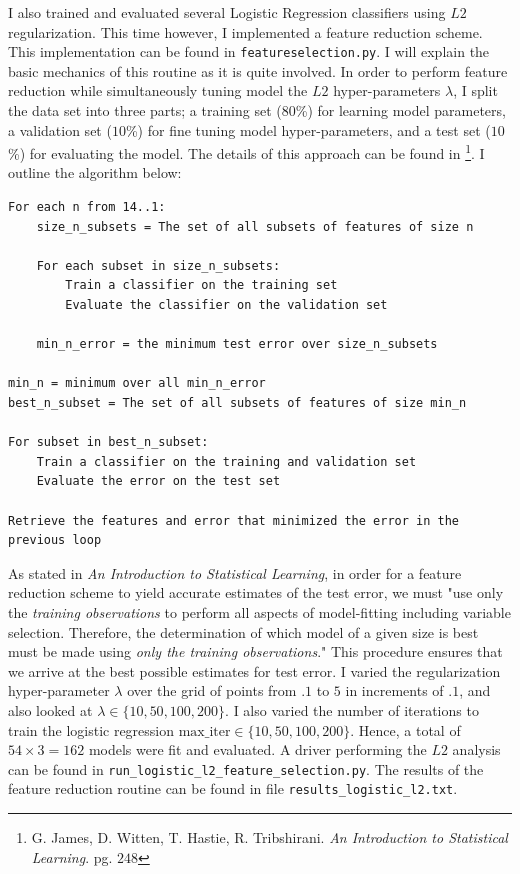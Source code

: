 \documentclass[11pt, oneside]{article}   	%
\begin{document}
I also trained and evaluated several Logistic Regression classifiers using $L2$ regularization. This time however, I implemented a feature reduction scheme. This implementation can be found in \texttt{featureselection.py}. I will explain the basic mechanics of this routine as it is quite involved. In order to perform feature reduction while simultaneously tuning model the $L2$ hyper-parameters $ \lambda $, I split the data set into three parts; a training set ($80$\%) for learning model parameters, a validation set ($10$\%) for fine tuning model hyper-parameters, and a test set ($10$\%) for evaluating the model. The details of this approach can be found in 
\footnote[3]{G. James, D. Witten, T. Hastie, R. Tribshirani. \textit{An Introduction to Statistical Learning}. pg. $248$}.
I outline the algorithm below:
\begin{verbatim}
For each n from 14..1:
    size_n_subsets = The set of all subsets of features of size n
  
    For each subset in size_n_subsets:
        Train a classifier on the training set
        Evaluate the classifier on the validation set
    
    min_n_error = the minimum test error over size_n_subsets
  
min_n = minimum over all min_n_error
best_n_subset = The set of all subsets of features of size min_n

For subset in best_n_subset:
    Train a classifier on the training and validation set
    Evaluate the error on the test set
    
Retrieve the features and error that minimized the error in the previous loop
\end{verbatim} 
As stated in \textit{An Introduction to Statistical Learning}, in order for a feature reduction scheme to yield accurate estimates of the test error, we must "use only the \textit{training observations} to perform all aspects of model-fitting including variable selection. Therefore, the determination of which model of a given size is best must be made using \textit{only the training observations}."  This procedure ensures that we arrive at the best possible estimates for test error. I varied the regularization hyper-parameter $ \lambda $ over the grid of points from $.1$ to $5$ in increments of $.1$, and also looked at $ \lambda \in \{ 10, 50, 100, 200 \} $. I also varied the number of iterations to train the logistic regression $ \text{max\_iter} \in \{ 10,50,100,200 \}$. Hence, a total of $54 \times 3 = 162$ models were fit and evaluated. A driver performing the $L2$ analysis can be found in \texttt{run\_logistic\_l2\_feature\_selection.py}. The results of the feature reduction routine can be found in file \texttt{results\_logistic\_l2.txt}.
\end{document}
